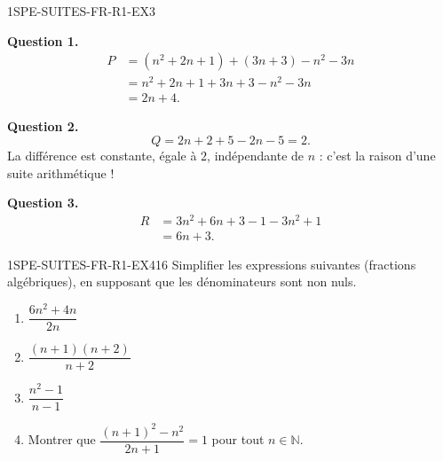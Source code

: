 \begin{corrige}{1SPE-SUITES-FR-R1-EX3}


\textbf{Question 1.}
\begin{align*}
P &= (n^2 + 2n + 1) + (3n + 3) - n^2 - 3n \\
  &= n^2 + 2n + 1 + 3n + 3 - n^2 - 3n \\
  &= 2n + 4.
\end{align*}


\textbf{Question 2.}
\[
Q = 2n + 2 + 5 - 2n - 5 = 2.
\]
La différence est constante, égale à $2$, indépendante de $n$ : c'est la raison d'une suite arithmétique !


\textbf{Question 3.}
\begin{align*}
R &= 3n^2 + 6n + 3 - 1 - 3n^2 + 1 \\
  &= 6n + 3.
\end{align*}

\end{corrige}


\begin{exercice}{1SPE-SUITES-FR-R1-EX4}{1}{6}
Simplifier les expressions suivantes (fractions algébriques), en supposant que les dénominateurs sont non nuls.
\begin{enumerate}
  \item $\dfrac{6n^2 + 4n}{2n}$
  \item $\dfrac{(n+1)(n+2)}{n+2}$
  \item $\dfrac{n^2 - 1}{n - 1}$
  \item Montrer que $\dfrac{(n+1)^2 - n^2}{2n+1} = 1$ pour tout $n \in \mathbb{N}$.
\end{enumerate}
\end{exercice}


